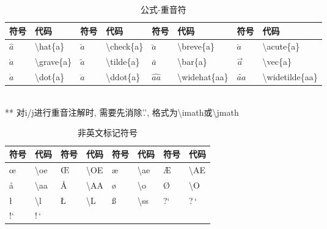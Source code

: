 \documentclass[UTF8,fontset=ubuntu]{ctexart}
\begin{document}
\begin{table}[H]
\begin{tabular}{l l l l l l l l}
	\hline
	符号 & 代码 & 符号 & 代码 & 符号 & 代码 & 符号 & 代码\\
	\hline
	$\hat{a}$ & \textbackslash hat\{a\} & $\check{a}$ & \textbackslash check\{a\} & $\breve{a}$ & \textbackslash breve\{a\} & $\acute{a}$ & \textbackslash acute\{a\}\\
	$\grave{a}$ & \textbackslash grave\{a\} & $\tilde{a}$ & \textbackslash tilde\{a\} & $\bar{a}$ & \textbackslash bar\{a\} & $\vec{a}$ & \textbackslash vec\{a\}\\
	$\dot{a}$ & \textbackslash dot\{a\} & $\ddot{a}$ & \textbackslash ddot\{a\} & $\widehat{aa}$ & \textbackslash widehat\{aa\} & $\widetilde{aa}$ & \textbackslash widetilde\{aa\}\\
	\hline
\end{tabular}\\[2mm]
** 对i/j进行重音注解时, 需要先消除'.', 格式为\textbackslash imath或\textbackslash jmath
\caption{公式-重音符}
\end{table}

\begin{table}[H]
\begin{tabular}{l l l l l l l l}
	\hline
	符号 & 代码 & 符号 & 代码 & 符号 & 代码 & 符号 & 代码\\
	\hline
	\oe & \textbackslash oe & \OE & \textbackslash OE & \ae & \textbackslash ae & \AE & \textbackslash AE\\
	\aa & \textbackslash aa & \AA & \textbackslash AA & \o & \textbackslash o & \O & \textbackslash O\\
	\l & \textbackslash l & \L & \textbackslash L & \ss & \textbackslash ss & ?` & ?\,`\\
	!` & !\,`\\
	\hline
\end{tabular}
\caption{非英文标记符号}
\end{table}
\end{document}
